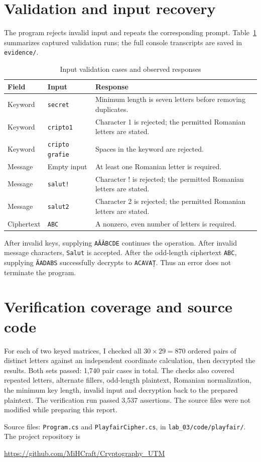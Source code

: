\documentclass{tum_report}
\begin{document}
\section{Validation and input recovery}
The program rejects invalid input and repeats the corresponding prompt.
Table~\ref{tab:validation} summarizes captured validation runs; the full
console transcripts are saved in \texttt{evidence/}.
\begin{table}[H]\caption{Input validation cases and observed responses}
\label{tab:validation}\centering\small
\begin{tabularx}{\textwidth}{l l X}\toprule
Field & Input & Response\\\midrule
Keyword & \texttt{secret} & Minimum length is seven letters before removing duplicates.\\
Keyword & \texttt{cripto1} & Character 1 is rejected; the permitted Romanian letters are stated.\\
Keyword & \texttt{cripto grafie} & Spaces in the keyword are rejected.\\
Message & Empty input & At least one Romanian letter is required.\\
Message & \texttt{salut!} & Character ! is rejected; the permitted Romanian letters are stated.\\
Message & \texttt{salut2} & Character 2 is rejected; the permitted Romanian letters are stated.\\
Ciphertext & \texttt{ABC} & A nonzero, even number of letters is required.\\\bottomrule
\end{tabularx}\end{table}
After invalid keys, supplying \texttt{AĂÂBCDE} continues the operation.
After invalid message characters, \texttt{Salut} is accepted. After the
odd-length ciphertext \texttt{ABC}, supplying \texttt{ĂADABS} successfully
decrypts to \texttt{ACAVAȚ}. Thus an error does not terminate the program.

\clearpage

\section{Verification coverage and source code}
For each of two keyed matrices, I checked all $30\times29=870$ ordered
pairs of distinct letters against an independent coordinate calculation,
then decrypted the results. Both sets passed: 1,740 pair cases in total.
The checks also covered repeated letters, alternate fillers, odd-length
plaintext, Romanian normalization, the minimum key length, invalid input
and decryption back to the prepared plaintext. The verification run passed
3,537 assertions. The source files were not modified while preparing this report.

Source files: \texttt{Program.cs} and \texttt{PlayfairCipher.cs},
in \texttt{lab\_03/code/playfair/}. The project repository is
\begin{center}
\url{https://github.com/MiHCraft/Cryptography_UTM}
\end{center}

\vspace{0.6cm}
{}

\end{document}

